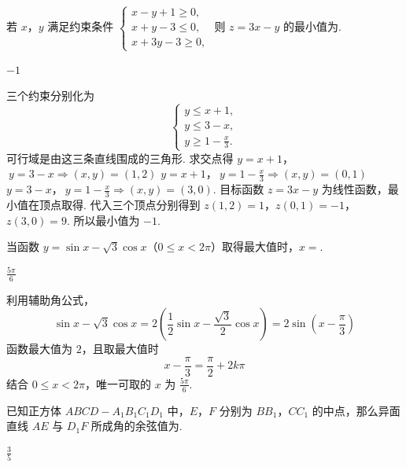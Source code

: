 \begin{problem}
若 \(x\)，\(y\) 满足约束条件 \(\begin{cases}
x - y + 1 \geqslant 0,\\
x + y - 3 \leqslant 0,\\
x + 3y - 3 \geqslant 0,
\end{cases}\) 则 \(z = 3x - y\) 的最小值为\fillinblank{}.
\end{problem}

\begin{answer}
\(-1\)
\end{answer}

\begin{solution}
三个约束分别化为
\[
\begin{cases}
y\leqslant x+1,\\
y\leqslant3-x,\\
y\geqslant1-\frac{x}{3}.
\end{cases}
\]
可行域是由这三条直线围成的三角形. 求交点得
\(y=x+1\)，\(\ y=3-x\Longrightarrow (x,y)=(1,2)\)
\(y=x+1\)，\(\ y=1-\frac{x}{3}\Longrightarrow (x,y)=(0,1)\)
\(y=3-x\)，\(\ y=1-\frac{x}{3}\Longrightarrow (x,y)=(3,0)\).
目标函数 \(z=3x-y\) 为线性函数，最小值在顶点取得. 代入三个顶点分别得到
 \(z(1,2)=1\)，\(z(0,1)=-1\)，\(z(3,0)=9\).
所以最小值为 \(-1\).
\end{solution}

\begin{problem}
当函数 \( y = \sin x - \sqrt{3}\cos x \)（\(0 \leqslant x < 2\pi\)）取得最大值时，\( x = \)\fillinblank{}.
\end{problem}

\begin{answer}
\(\frac{5\pi}{6}\)
\end{answer}

\begin{solution}
利用辅助角公式，
\[
\sin x-\sqrt3\cos x
=2\left(\frac12\sin x-\frac{\sqrt3}{2}\cos x\right)
=2\sin\left(x-\frac{\pi}{3}\right)
\]
函数最大值为 \(2\)，且取最大值时
\[
x-\frac{\pi}{3}=\frac{\pi}{2}+2k\pi
\]
结合 \(0\leqslant x<2\pi\)，唯一可取的 \(x\) 为 \(\frac{5\pi}{6}\).
\end{solution}

\begin{problem}
已知正方体 \(ABCD - A_{1}B_{1}C_{1}D_{1}\) 中，\(E\)，\(F\) 分别为 \(BB_{1}\)，\(CC_{1}\) 的中点，那么异面直线 \(AE\) 与 \(D_{1}F\) 所成角的余弦值为\fillinblank{}.
\end{problem}

\begin{answer}
\(\frac{3}{5}\)
\end{answer}

